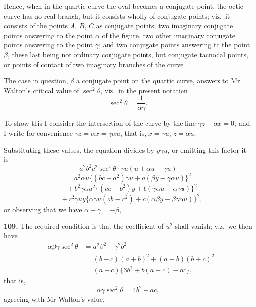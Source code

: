 \documentclass[11pt,a4paper]{book}
\begin{document}
Hence, when in the quartic curve the oval becomes a conjugate point, the octic curve has no real branch, but it consists wholly of conjugate points; viz.\ it consists of the points $A$, $B$, $C$ as conjugate points; two imaginary conjugate points answering to the point $\alpha$ of the figure, two other imaginary conjugate points answering to the point $\gamma$; and two conjugate points answering to the point $\beta$, these last being not ordinary conjugate points, but conjugate tacnodal points, or points of contact of two imaginary branches of the curve.

The case in question, $\beta$ a conjugate point on the quartic curve, answers to Mr Walton's critical value of $\sec^2\theta$, viz.\ in the present notation
\[
\sec^2\theta = \frac{1}{\alpha\gamma}.
\]

To show this I consider the intersection of the curve by the line $\gamma z - \alpha x = 0$; and I write for convenience $\gamma z = \alpha x = \gamma\alpha u$, that is, $x = \gamma u$, $z = \alpha u$.

Substituting these values, the equation divides by $y\gamma u$, or omitting this factor it is
\[
a^2b^2c^2\sec^2\theta\cdot \gamma u(u + \alpha u + \gamma u)
\]
\[
= a^2\alpha u\{(bc - a^2)\gamma u + a(\beta y - \gamma\alpha u)\}^2
\]
\[
\quad {}+ b^2\gamma\alpha u^2\{(ca - b^2)y + b(\gamma\alpha u - \alpha\gamma u)\}^2
\]
\[
\quad {}+ c^2\gamma uy\{\alpha\gamma u(ab - c^2) + c(\alpha\beta y - \beta\gamma\alpha u)\}^2,
\]
or observing that we have $\alpha + \gamma = -\beta$,

\noindent\textbf{109.} The required condition is that the coefficient of $u^2$ shall vanish; viz.\ we then have
\begin{align*}
-\alpha\beta\gamma\sec^2\theta &= a^2\beta^2 + \gamma^2b^2 \\
&= (b - c)(a + b)^2 + (a - b)(b + c)^2 \\
&= (a - c)\{3b^2 + b(a + c) - ac\},
\end{align*}
that is,
\[
\alpha\gamma\sec^2\theta = 4b^2 + ac,
\]
agreeing with Mr Walton's value.
\end{document}
